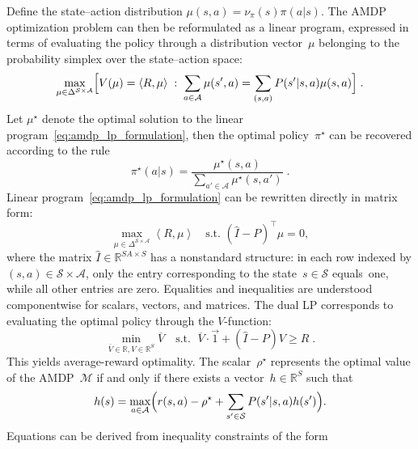 \documentclass{article}
\numberwithin{equation}{section}
\newcommand{\cA}{\mathcal{A}}
\newcommand{\eqsp}{\;}
\begin{document}
Define the state–action distribution $\mu(s,a)=\nu_{\pi}(s)\pi(a|s)$. The AMDP optimization problem can then be reformulated as a linear program, expressed in terms of evaluating the policy through a distribution vector~$\mu$ belonging to the probability simplex over the state–action space:
\begin{equation}\label{eq:amdp_lp_formulation}
    \max_{\mu\in\Delta^{\mathcal{S}\times\mathcal{A}} } \Bigl[ V(\mu)= \langle R,\mu\rangle \eqsp : \eqsp \sum_{a\in\mathcal{A}}\mu(s',a)=\sum_{(s,a)}P(s'|s,a)\mu(s,a)\Bigr]\eqsp.
\end{equation}
Let $\mu^\star$ denote the optimal solution to the linear program~\eqref{eq:amdp_lp_formulation}, then the optimal policy~$\pi^\star$ can be recovered according to the rule
\begin{equation}\label{eq:dual_to_policy}
    \pi^\star(a|s)=\frac{\mu^\star(s,a)}{\sum\limits_{a'\in\mathcal{A}}\mu^\star(s,a')}\eqsp.
\end{equation}
Linear program~\eqref{eq:amdp_lp_formulation} can be rewritten directly in matrix form:
\begin{equation}\label{eq:amdp_lp_matrix}
\max\limits_{\mu\in\Delta^{\mathcal{S}\times\mathcal{A}} }\left \langle R,\mu \right \rangle\quad  
    \text{s.t. } (\widehat I - P)^\top \mu = 0,
\end{equation}
where the matrix $\widehat{I}\in \mathbb{R}^{SA\times S}$ has a nonstandard structure: in each row indexed by $(s,a)\in\mathcal{S}\times\cA$, only the entry corresponding to the state~$s \in \mathcal{S}$ equals~one, while all other entries are zero. Equalities and inequalities are understood componentwise for scalars, vectors, and matrices. The dual LP corresponds to evaluating the optimal policy through the $V$-function:
\begin{equation}\label{eq:amdp_dual_form} \min\limits_{\overline{V}\in\mathbb{R},V\in\mathbb{R}^{S}}\overline{V} \quad
    \text{s.t. } \eqsp \overline{V}\cdot \vec{1} + (\widehat{I}-P) V\geq R\eqsp.
\end{equation}
This yields average-reward optimality.  
The scalar~$\rho^\star$ represents the optimal value of the AMDP~$\mathcal{M}$ if and only if there exists a vector~$h \in \mathbb{R}^S$ such that
\begin{gather*}
    h(s)=\max\limits_{a \in\mathcal{A}} \Bigl( r(s, a) - \rho^\star +  \sum\limits_{s'\in\mathcal{S}} P(s'|s, a) h(s') \Bigr).
\end{gather*}
Equations can be derived from inequality constraints of the form
\end{document}
